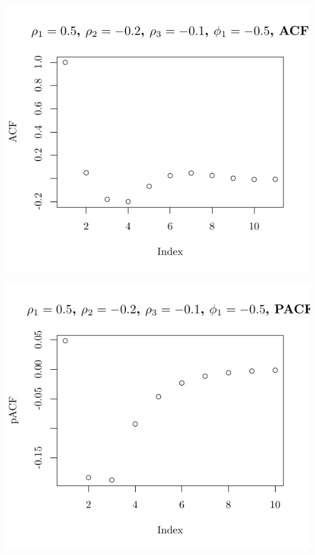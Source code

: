 \documentclass[10pt]{paper}\usepackage[]{graphicx}\usepackage[]{color}
\makeatletter
\def\maxwidth{ %
  \ifdim\Gin@nat@width>\linewidth
    \linewidth
  \else
    \Gin@nat@width
  \fi
}
\newenvironment{knitrout}{}{} %
\makeatother
\begin{document}
\begin{knitrout}
{\centering \includegraphics[width=\maxwidth]{figure/graphics-plotter-129} 

}




{\centering \includegraphics[width=\maxwidth]{figure/graphics-plotter-130} 

}





\end{knitrout}
\end{document}
